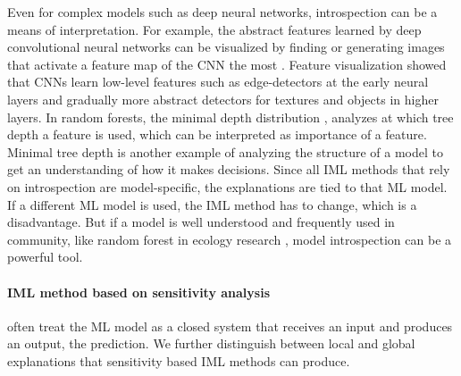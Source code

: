 \documentclass[runningheads]{llncs}
\begin{document}
Even for complex models such as deep neural networks, introspection can be a means of interpretation.
For example, the abstract features learned by deep convolutional neural networks can be visualized by finding or generating images that activate a feature map of the CNN the most \cite{olah2017feature}.
Feature visualization showed that CNNs learn low-level features such as edge-detectors at the early neural layers and gradually more abstract detectors for textures and objects in higher layers.
In random forests, the minimal depth distribution \cite{randomForestExplainer,ishwaran2010high}, analyzes at which tree depth a feature is used, which can be interpreted as importance of a feature.
Minimal tree depth is another example of analyzing the structure of a model to get an understanding of how it makes decisions.
Since all IML methods that rely on introspection are model-specific, the explanations are tied to that ML model.
If a different ML model is used, the IML method has to change, which is a disadvantage.
But if a model is well understood and frequently used in community, like random forest in ecology research \cite{cutler2007random}, model introspection can be a powerful tool.


\paragraph{IML method based on sensitivity analysis} often treat the ML model as a closed system that receives an input and produces an output, the prediction.
We further distinguish between local and global explanations that sensitivity based IML methods can produce.
\end{document}
